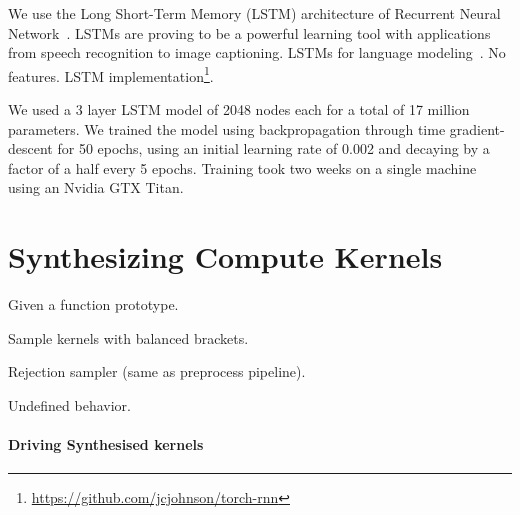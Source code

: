 \documentclass[preprint,nonatbib,10pt,nocopyrightspace]{sigplanconf}
\begin{document}

We use the Long Short-Term Memory (LSTM) architecture of Recurrent
Neural Network~\cite{Hochreiter1997,Mikolov2015}. LSTMs are proving to
be a powerful learning tool with applications from speech recognition
to image captioning. LSTMs for language
modeling~\cite{Sundermeyer2012}. No features. LSTM
implementation\footnote{\url{https://github.com/jcjohnson/torch-rnn}}.

%
%
%
%
We used a 3 layer LSTM model of 2048 nodes each for a total of 17
million parameters. We trained the model using backpropagation through
time gradient-descent for 50 epochs, using an initial learning rate of
0.002 and decaying by a factor of a half every 5 epochs. Training took
two weeks on a single machine using an Nvidia GTX Titan.



\section{Synthesizing Compute Kernels}\label{sec:}

Given a function prototype.

Sample kernels with balanced brackets.

Rejection sampler (same as preprocess pipeline).

Undefined behavior.

\paragraph{Driving Synthesised kernels}
\end{document}
